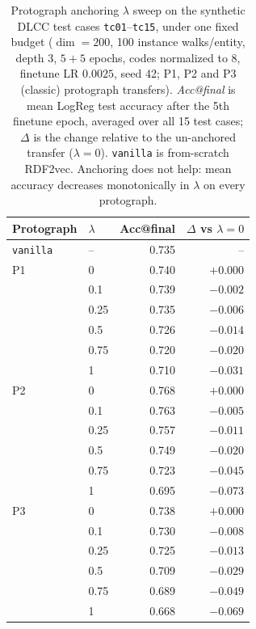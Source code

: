 \begin{table}[t]
\centering
\caption{Protograph anchoring $\lambda$ sweep on the synthetic DLCC test cases \texttt{tc01}--\texttt{tc15}, under one fixed budget ($\dim=200$, 100 instance walks/entity, depth 3, $5+5$ epochs, codes normalized to $8$, finetune LR $0.0025$, seed 42; P1, P2 and P3 (classic) protograph transfers). \emph{Acc@final} is mean LogReg test accuracy after the 5th finetune epoch, averaged over all 15 test cases; $\Delta$ is the change relative to the un-anchored transfer ($\lambda=0$). \texttt{vanilla} is from-scratch RDF2vec. Anchoring does not help: mean accuracy decreases monotonically in $\lambda$ on every protograph.}
\label{tab:anchoring_lambda}
\begin{tabular}{llrr}
\toprule
Protograph & $\lambda$ & Acc@final & $\Delta$ vs $\lambda{=}0$ \\
\midrule
\texttt{vanilla} & -- & 0.735 & -- \\
\midrule
P1 & 0 & 0.740 & $+0.000$ \\
 & 0.1 & 0.739 & $-0.002$ \\
 & 0.25 & 0.735 & $-0.006$ \\
 & 0.5 & 0.726 & $-0.014$ \\
 & 0.75 & 0.720 & $-0.020$ \\
 & 1 & 0.710 & $-0.031$ \\
\midrule
P2 & 0 & 0.768 & $+0.000$ \\
 & 0.1 & 0.763 & $-0.005$ \\
 & 0.25 & 0.757 & $-0.011$ \\
 & 0.5 & 0.749 & $-0.020$ \\
 & 0.75 & 0.723 & $-0.045$ \\
 & 1 & 0.695 & $-0.073$ \\
\midrule
P3 & 0 & 0.738 & $+0.000$ \\
 & 0.1 & 0.730 & $-0.008$ \\
 & 0.25 & 0.725 & $-0.013$ \\
 & 0.5 & 0.709 & $-0.029$ \\
 & 0.75 & 0.689 & $-0.049$ \\
 & 1 & 0.668 & $-0.069$ \\
\bottomrule
\end{tabular}
\end{table}
